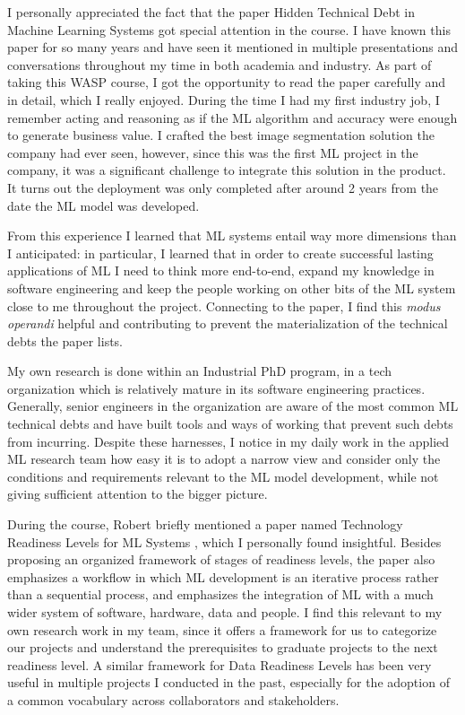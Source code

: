 \documentclass[11pt]{article}
\begin{document}
I personally appreciated the fact that the paper Hidden Technical Debt in Machine Learning Systems \citep{sculley2015} got special attention in the course. I have known this paper for so many years and have seen it mentioned in multiple presentations and conversations throughout my time in both academia and industry. As part of taking this WASP course, I got the opportunity to read the paper carefully and in detail, which I really enjoyed. During the time I had my first industry job, I remember acting and reasoning as if the ML algorithm and accuracy were enough to generate business value. I crafted the best image segmentation solution the company had ever seen, however, since this was the first ML project in the company, it was a significant challenge to integrate this solution in the product. It turns out the deployment was only completed after around 2 years from the date the ML model was developed.

From this experience I learned that ML systems entail way more dimensions than I anticipated: in particular, I learned that in order to create successful lasting applications of ML I need to think more end-to-end, expand my knowledge in software engineering and keep the people working on other bits of the ML system close to me throughout the project. Connecting to the paper, I find this \textit{modus operandi} helpful and contributing to prevent the materialization of the technical debts the paper lists.

My own research is done within an Industrial PhD program, in a tech organization which is relatively mature in its software engineering practices. Generally, senior engineers in the organization are aware of the most common ML technical debts and have built tools and ways of working that prevent such debts from incurring. Despite these harnesses, I notice in my daily work in the applied ML research team how easy it is to adopt a narrow view and consider only the conditions and requirements relevant to the ML model development, while not giving sufficient attention to the bigger picture.

During the course, Robert briefly mentioned a paper named Technology Readiness Levels for ML Systems \citep{trl}, which I personally found insightful. Besides proposing an organized framework of stages of readiness levels, the paper also emphasizes a workflow in which ML development is an iterative process rather than a sequential process, and emphasizes the integration of ML with a much wider system of software, hardware, data and people. I find this relevant to my own research work in my team, since it offers a framework for us to categorize our projects and understand the prerequisites to graduate projects to the next readiness level. A similar framework for Data Readiness Levels \citep{drl} has been very useful in multiple projects I conducted in the past, especially for the adoption of a common vocabulary across collaborators and stakeholders.
\end{document}
